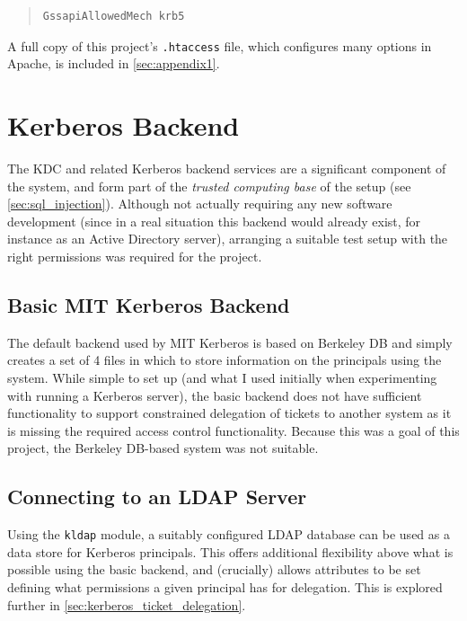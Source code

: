 \documentclass[12pt]{report}
\begin{document}
\begin{quote}
\begin{verbatim}
GssapiAllowedMech krb5
\end{verbatim}
\end{quote}

A full copy of this project's \verb+.htaccess+ file, which configures many options in Apache, is included in \autoref{sec:appendix1}.

\section{Kerberos Backend}
\label{sec:kerberos_backend}
The KDC and related Kerberos backend services are a significant component of the system, and form part of the \textit{trusted computing base} of the setup (see \autoref{sec:sql_injection}). Although not actually requiring any new software development (since in a real situation this backend would already exist, for instance as an Active Directory server), arranging a suitable test setup with the right permissions was required for the project.

\subsection{Basic MIT Kerberos Backend}
The default backend used by MIT Kerberos is based on Berkeley DB and simply creates a set of 4 files in which to store information on the principals using the system\cite{KDC-database-docs}. While simple to set up (and what I used initially when experimenting with running a Kerberos server), the basic backend does not have sufficient functionality to support constrained delegation of tickets to another system as it is missing the required access control functionality\cite{KRB-DELEG}. Because this was a goal of this project, the Berkeley DB-based system was not suitable.

\subsection{Connecting to an LDAP Server}
Using the \texttt{kldap} module, a suitably configured LDAP database can be used as a data store for Kerberos principals. This offers additional flexibility above what is possible using the basic backend, and (crucially) allows attributes to be set defining what permissions a given principal has for delegation. This is explored further in \autoref{sec:kerberos_ticket_delegation}.
\end{document}
